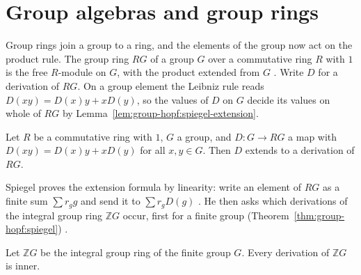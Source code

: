 \section{Group algebras and group rings}\label{sec:group-hopf:group-algebras}

Group rings join a group to a ring, and the elements of the group now act on
the product rule.
The group ring $RG$ of a group $G$ over a commutative
ring $R$ with $1$ is the free $R$-module on $G$, with the product extended
from $G$ \cite[p.~2956]{Spiegel1994}. Write $D$ for a derivation of $RG$. On a
group element the Leibniz rule reads $D(xy)=D(x)y+xD(y)$, so the values of $D$
on $G$ decide its values on whole of $RG$ by
Lemma~\ref{lem:group-hopf:spiegel-extension}.

\begin{lemma}\label{lem:group-hopf:spiegel-extension}
Let $R$ be a commutative ring with $1$, $G$ a group, and $D\colon G\to RG$ a map with
$D(xy)=D(x)y+xD(y)$ for all $x,y\in G$. Then $D$ extends to a derivation of $RG$.
\end{lemma}

Spiegel proves the extension formula by linearity: write an element of $RG$ as
a finite sum $\sum r_g g$ and send it to $\sum r_g D(g)$
\cite[p.~2956]{Spiegel1994}. He then asks which derivations of the integral
group ring $\mathbb{Z}G$ occur, first for a finite group
(Theorem~\ref{thm:group-hopf:spiegel}) \cite[p.~2955]{Spiegel1994}.

\begin{theorem}\label{thm:group-hopf:spiegel}
Let $\mathbb{Z}G$ be the integral group ring of the finite group $G$. Every
derivation of $\mathbb{Z}G$ is inner.
\end{theorem}

